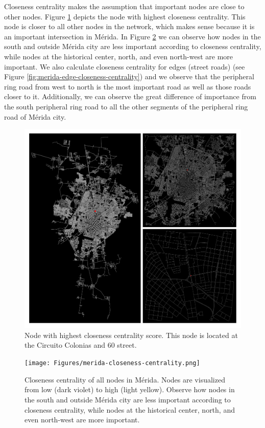 Closeness centrality makes the assumption that important nodes are close to other nodes. Figure \ref{fig:merida-max-node-closeness-centrality} depicts the node with highest closeness centrality. This node is closer to all other nodes in the network, which makes sense because it is an important intersection in Mérida. In Figure \ref{fig:merida-closeness-centrality} we can observe how nodes in the south and outside Mérida city are less important according to closeness centrality, while nodes at the historical center, north, and even north-west are more important. We also calculate closeness centrality for edges (street roads) (see Figure \ref{fig:merida-edge-closeness-centrality}) and we observe that the peripheral ring road from west to north is the most important road as well as those roads closer to it. Additionally, we can observe the great difference of importance from the south peripheral ring road to all the other segments of the peripheral ring road of Mérida city.

\begin{figure}[htpb]
  \centering
  \includegraphics[width=1.0\textwidth]{Figures/merida-node-closeness-centrality.png}
  \caption{Node with highest closeness centrality score. This node is located at the Circuito Colonias and 60 street.
    \label{fig:merida-max-node-closeness-centrality}}
\end{figure}

\begin{figure}[htpb]
  \centering
  \texttt{[image: Figures/merida-closeness-centrality.png]}
  \caption{Closeness centrality of all nodes in Mérida. Nodes are visualized from low (dark violet) to high (light yellow). Observe how nodes in the south and outside Mérida city are less important according to closeness centrality, while nodes at the historical center, north, and even north-west are more important.
    \label{fig:merida-closeness-centrality}}
\end{figure}

